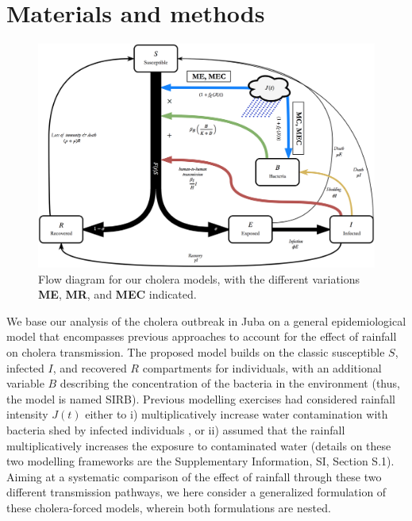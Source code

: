 \section{Materials and methods}
\label{sec:meth}
\begin{figure}
  \centering
  \includegraphics[width=\textwidth]{fig_cholera-rainfall/Lemaitre_ACTROP_2018_42_R1_fig1.png}
  \caption{Flow diagram for our cholera models, with the different variations \textbf{ME}, \textbf{MR}, and \textbf{MEC} indicated.}
  \label{diagram}
\end{figure}

We base our analysis of the cholera outbreak in Juba on a general epidemiological model that encompasses previous approaches to account for the effect of rainfall on cholera transmission. The proposed model builds on the classic susceptible $S$, infected $I$, and recovered $R$ compartments for individuals, with an additional variable $B$ describing the concentration of the bacteria in the environment (thus, the model is named SIRB). Previous modelling exercises had considered rainfall intensity $J(t)$ either to i) multiplicatively increase water contamination with bacteria shed by infected individuals \cite{bertuzzoProbabilityExtinctionHaiti2016,pasettoRealtimeProjectionsCholera2017}, or ii) assumed that the rainfall multiplicatively increases the exposure to contaminated water \cite{eisenbergExaminingRainfallCholera2013} (details on these two modelling frameworks are the Supplementary Information, SI, Section S.1). Aiming at a systematic comparison of the effect of rainfall through these two different transmission pathways, we here consider a generalized formulation of these cholera-forced models, wherein both formulations are nested.

